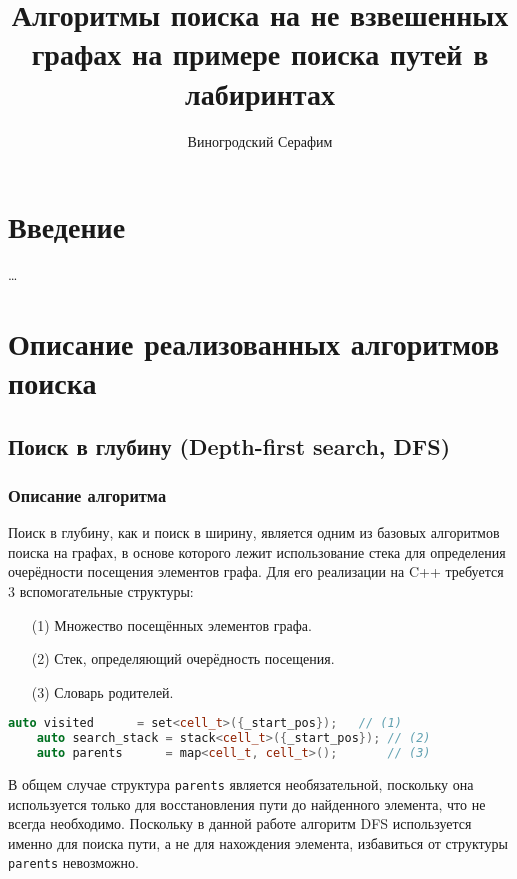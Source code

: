 \documentclass[a4paper, 12pt]{article}
\title{Алгоритмы поиска на не взвешенных графах на примере поиска путей в лабиринтах}
\author{Виногродский Серафим}
\begin{document}
\begin{titlepage}
    \maketitle
    \tableofcontents
    \thispagestyle{empty}
\end{titlepage}

\section{Введение}
\ldots

\section{Описание реализованных алгоритмов поиска}
\subsection{Поиск в глубину (Depth-first search, DFS)}
\subsubsection{Описание алгоритма}
\label{ssub:DFS_algorithm}
Поиск в глубину, как и поиск в ширину, является одним из базовых алгоритмов поиска на графах, в основе которого лежит использование стека для определения очерёдности посещения элементов графа. Для его реализации на C++ требуется 3 вспомогательные структуры:
\begin{itemize}
    \item[(1)] Множество посещённых элементов графа.
    \item[(2)] Стек, определяющий очерёдность посещения.
    \item[(3)] Словарь родителей.
\end{itemize}

\begin{lstlisting}[language=C++]
    auto visited      = set<cell_t>({_start_pos});   // (1)
    auto search_stack = stack<cell_t>({_start_pos}); // (2)
    auto parents      = map<cell_t, cell_t>();       // (3)
\end{lstlisting}

В общем случае структура \verb|parents| является необязательной, поскольку она используется только для восстановления пути до найденного элемента, что не всегда необходимо. Поскольку в данной работе алгоритм DFS используется именно для поиска пути, а не для нахождения элемента, избавиться от структуры \verb|parents| невозможно.
\end{document}
